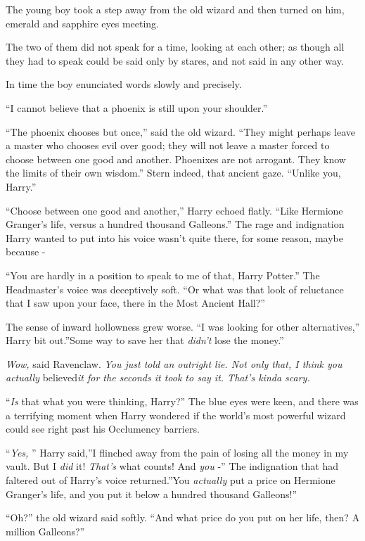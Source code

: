 The young boy took a step away from the old wizard and then turned on
him, emerald and sapphire eyes meeting.

The two of them did not speak for a time, looking at each other; as
though all they had to speak could be said only by stares, and not said
in any other way.

In time the boy enunciated words slowly and precisely.

``I cannot believe that a phoenix is still upon your shoulder.''

``The phoenix chooses but once,'' said the old wizard. ``They might
perhaps leave a master who chooses evil over good; they will not leave a
master forced to choose between one good and another. Phoenixes are not
arrogant. They know the limits of their own wisdom.'' Stern indeed, that
ancient gaze. ``Unlike you, Harry.''

``Choose between one good and another,'' Harry echoed flatly. ``Like
Hermione Granger's life, versus a hundred thousand Galleons.'' The rage
and indignation Harry wanted to put into his voice wasn't quite there,
for some reason, maybe because -

``You are hardly in a position to speak to me of that, Harry Potter.''
The Headmaster's voice was deceptively soft. ``Or what was that look of
reluctance that I saw upon your face, there in the Most Ancient Hall?''

The sense of inward hollowness grew worse. ``I was looking for other
alternatives,'' Harry bit out.''Some way to save her that \emph{didn't}
lose the money.''

\emph{Wow,} said Ravenclaw. \emph{You just told an outright lie. Not
only that, I think you actually} believed\emph{it for the seconds it
took to say it. That's kinda scary.}

``\emph{Is} that what you were thinking, Harry?'' The blue eyes were
keen, and there was a terrifying moment when Harry wondered if the
world's most powerful wizard could see right past his Occlumency
barriers.

``\emph{Yes,} '' Harry said,''I flinched away from the pain of losing all
the money in my vault. But I \emph{did} it! \emph{That's} what counts!
And \emph{you} -'' The indignation that had faltered out of Harry's
voice returned.''You \emph{actually} put a price on Hermione Granger's
life, and you put it below a hundred thousand Galleons!''

``Oh?'' the old wizard said softly. ``And what price do you put on her
life, then? A million Galleons?''

